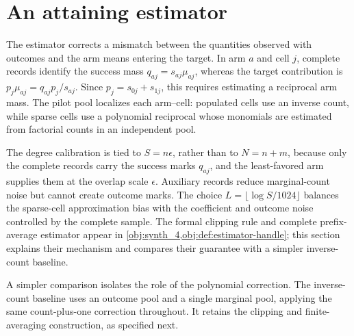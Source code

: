 \documentclass[11pt]{article}
\begin{document}
\section{An attaining estimator}\label{sec:attaining-estimator}

The estimator corrects a mismatch between the quantities observed with outcomes and the arm means entering the target. In arm \(a\) and cell \(j\), complete records identify the success mass \(q_{aj}=s_{aj}\mu_{aj}\), whereas the target contribution is \(p_j\mu_{aj}=q_{aj}p_j/s_{aj}\). Since \(p_j=s_{0j}+s_{1j}\), this requires estimating a reciprocal arm mass. The pilot pool localizes each arm--cell: populated cells use an inverse count, while sparse cells use a polynomial reciprocal whose monomials are estimated from factorial counts in an independent pool.

The degree calibration is tied to \(S=n\epsilon\), rather than to \(N=n+m\), because only the complete records carry the success marks \(q_{aj}\), and the least-favored arm supplies them at the overlap scale \(\epsilon\). Auxiliary records reduce marginal-count noise but cannot create outcome marks. The choice \(L=\lfloor\log S/1024\rfloor\) balances the sparse-cell approximation bias with the coefficient and outcome noise controlled by the complete sample. The formal clipping rule and complete prefix-average estimator appear in \cref{obj:synth_4,obj:def:estimator-handle}; this section explains their mechanism and compares their guarantee with a simpler inverse-count baseline.





A simpler comparison isolates the role of the polynomial correction. The inverse-count baseline  uses an outcome pool and a single marginal pool, applying the same count-plus-one correction throughout. It retains the clipping and finite-averaging construction, as specified next.
\end{document}
